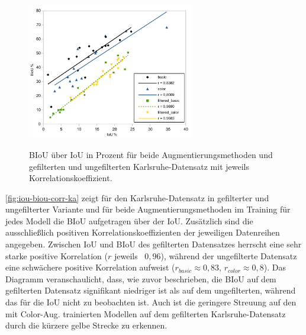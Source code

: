 \begin{figure}
	\centering
	\vspace{-20pt} %
	\includegraphics[width=0.65\textwidth]{Bilder/iou-biou-correlation-karlsruhe.pdf}
	\vspace{-5pt}
	\caption[BIoU der Modelle der Radwegerkennung auf dem Karlsruhe-Datensatz aufgetragen über deren IoU.]{\unskip}
	BIoU über IoU in Prozent für beide Augmentierungsmethoden und gefilterten und ungefilterten Karlsruhe-Datensatz 
	mit jeweils Korrelationskoeffizient. 
	\label{fig:iou-biou-corr-ka}
\end{figure}

\autoref{fig:iou-biou-corr-ka} zeigt für den Karlsruhe-Datensatz in 
gefilterter und ungefilterter Variante und für beide Augmentierungsmethoden im Training für jedes Modell die BIoU aufgetragen 
über der IoU. Zusätzlich sind die ausschließlich positiven Korrelationskoeffizienten der jeweiligen Datenreihen angegeben. 
Zwischen IoU und BIoU des gefilterten Datensatzes herrscht eine sehr starke positive Korrelation ($r$ jeweils ~$0,96$), 
während der ungefilterte Datensatz eine schwächere positive Korrelation aufweist ($r_{basic} \approx 0,83$, 
$r_{color}\approx 0,8$). Das Diagramm veranschaulicht, dass, wie zuvor beschrieben, die BIoU auf 
dem gefilterten Datensatz signifikant niedriger ist als auf dem ungefilterten, während das für die IoU 
nicht zu beobachten ist. Auch ist die geringere Streuung auf den mit Color-Aug. trainierten Modellen auf dem 
gefilterten Karlsruhe-Datensatz durch die kürzere gelbe Strecke zu erkennen.  

